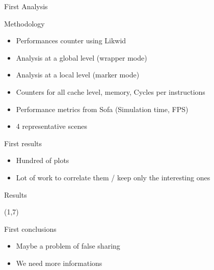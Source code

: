 \documentclass[xcolor={usenames,dvipsnames}]{beamer}
\begin{document}
\begin{frame}{First Analysis}
    \begin{block}{Methodology}
        \begin{itemize}
            \item Performances counter using Likwid \cite{Treibig10LIKWID}
            \item Analysis at a global level (wrapper mode)
            \item Analysis at a local level (marker mode)
            \item Counters for all cache level, memory, Cycles per instructions
            \item Performance metrics from Sofa (Simulation time, FPS)
            \item 4 representative scenes
        \end{itemize}
    \end{block}
    \pause
    \begin{exampleblock}{First results}
        \begin{itemize}
            \item Hundred of plots
            \item Lot of work to correlate them / keep only the interesting ones
        \end{itemize}
    \end{exampleblock}
\end{frame}

\begin{frame}{Results}

    {
        \begin{textblock}{14}(1,7)
            \begin{alertblock}{First conclusions}
                \begin{itemize}
                    \item Maybe a problem of false sharing
                    \item We need more informations
                \end{itemize}
            \end{alertblock}
        \end{textblock}
    }
\end{frame}
\end{document}
